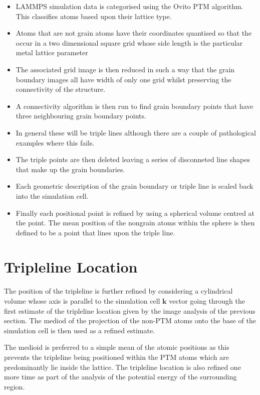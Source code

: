\documentclass[12pt,a4paper]{book}
\begin{document}
\begin{itemize}

	\item LAMMPS simulation data is categorised using the Ovito PTM algorithm. This classifies atoms based upon their lattice type.
	\item Atoms that are not grain  atoms have their coordinates quantised so that the occur in a two dimensional square grid whose side length is the particular metal lattice parameter
	\item The associated grid image is then reduced in such a way that the grain boundary images all have width of only one grid whilst preserving the connectivity of the structure.
	\item A connectivity algorithm is then run to find grain boundary points that have three neighbouring grain boundary points.
	\item In general these will be triple lines although there are a couple of pathological examples where this fails.
	\item The triple points are then deleted leaving a series of disconneted line shapes that make up the grain boundaries.
	\item Each geometric description of the grain boundary or triple line is scaled back into the simulation cell. 
	\item Finally each positional point is refined by using a spherical volume centred at the point. The mean position of the nongrain atoms within the sphere is then defined to be a point that lines upon the triple line. 

\end{itemize} 

\section{Tripleline Location}

The position of the tripleline is further refined by considering a cylindrical volume whose axis is parallel to the simulation cell $\mathbf{k}$ vector going through the first estimate of the tripleline location given by the image analysis of the previous section. The mediod of the projection of the non-PTM atoms onto the base of the simulation cell is then used as a refined estimate. 

The medioid is preferred to a simple mean of the atomic positions as this prevents the tripleline being positioned within the PTM atoms which are predominantly lie inside the lattice. The tripleline location is also refined one more time as part of the analysis of the potential energy of the surrounding region.
\end{document}
